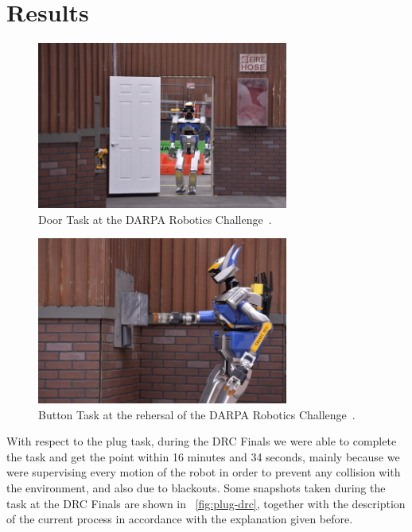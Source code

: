 \section{Results}
	\label{sec:results}
	
	\begin{figure}[t]
		\centering
		\includegraphics[height = 5.5cm]{img/door-drc}
		\caption{Door Task at the DARPA Robotics Challenge~\cite{DARPA}.}
		\label{fig:door-drc}
	\end{figure}
	
	\begin{figure}[t]
		\centering
		\includegraphics[height = 5.5cm]{img/button-drc}
		\caption{Button Task at the rehersal of the DARPA Robotics Challenge~\cite{DARPA}.}
		\label{fig:button-drc}
	\end{figure}
	
	With respect to the plug task, during the DRC Finals we were able to complete the task
	and get the point	within 16 minutes and 34 seconds, mainly because we were supervising
	every motion of the robot in order to prevent any collision with the environment, and
	also due to blackouts.
	Some snapshots taken during the task at the DRC Finals are shown in
	\figurename~\ref{fig:plug-drc}, together with the description of the current process
	in accordance with the explanation given before.
	
